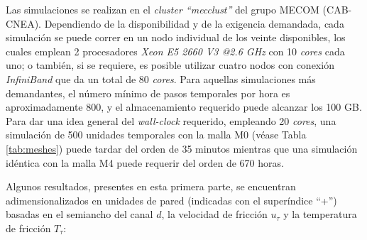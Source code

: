 Las simulaciones se realizan en el \textit{cluster ``mecclust''} del grupo MECOM (CAB-CNEA). Dependiendo de la disponibilidad y de la exigencia demandada, cada simulación se puede \linebreak correr en un nodo individual de los veinte disponibles, los cuales emplean 2 procesadores \textit{Xeon E5 2660 V3 @2.6 GHz} con 10 \textit{cores} cada uno; o también, si se requiere, es posible utilizar cuatro nodos con conexión \textit{InfiniBand} que da un total de 80 \textit{cores}. Para aquellas simulaciones más demandantes, el número mínimo de pasos temporales por hora es aproximadamente 800, y el almacenamiento requerido puede alcanzar los 100 GB. Para dar una idea general del \textit{wall-clock} requerido, empleando 20 \textit{cores}, una simulación de 500 unidades temporales con la malla M0 (véase Tabla \ref{tab:meshes}) puede tardar del orden de 35 minutos mientras que una simulación idéntica con la malla M4 puede requerir del orden de 670 horas.       


\begin{table}[H]
\centering
{}
\caption{Distintas resoluciones espaciales y temporales utilizadas en las simulaciones de validación. Debido a que la discretización en la dirección $Y$ es no uniforme, se reporta el máximo $\Delta y$ asociado.}
\label{tab:meshes}
\end{table}

Algunos resultados, presentes en esta primera parte, se encuentran adimensionalizados en unidades de pared (indicadas con el superíndice ``+'') basadas en el semiancho del canal $d$, la velocidad de fricción $u_{\tau}$ y la temperatura de fricción $T_{\tau}$:

